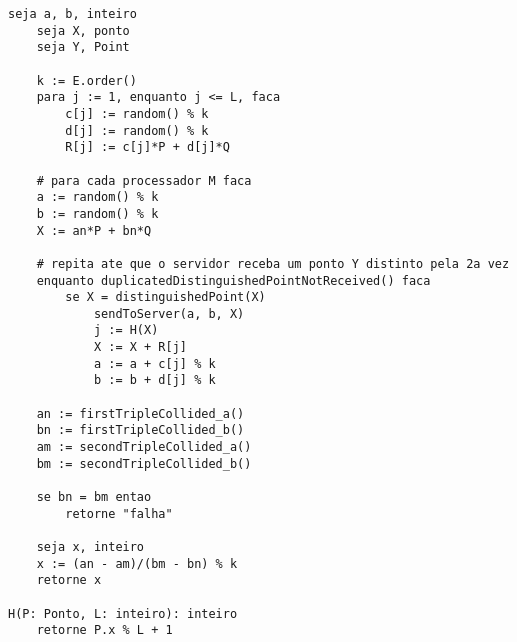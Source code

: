 \begin{anexosenv}
\begin{lstlisting}[caption={Algoritmo Pollard-rho paralelizado.},label=parallelized]
	seja a, b, inteiro
	seja X, ponto
	seja Y, Point

	k := E.order()
	para j := 1, enquanto j <= L, faca
		c[j] := random() % k
		d[j] := random() % k
		R[j] := c[j]*P + d[j]*Q

	# para cada processador M faca
	a := random() % k
	b := random() % k
	X := an*P + bn*Q

	# repita ate que o servidor receba um ponto Y distinto pela 2a vez
	enquanto duplicatedDistinguishedPointNotReceived() faca
		se X = distinguishedPoint(X)
			sendToServer(a, b, X)
			j := H(X)
			X := X + R[j]
			a := a + c[j] % k
			b := b + d[j] % k

	an := firstTripleCollided_a()
	bn := firstTripleCollided_b()
	am := secondTripleCollided_a()
	bm := secondTripleCollided_b()

	se bn = bm entao
		retorne "falha"

	seja x, inteiro
	x := (an - am)/(bm - bn) % k
	retorne x

H(P: Ponto, L: inteiro): inteiro
	retorne P.x % L + 1

\end{lstlisting}

\end{anexosenv}
